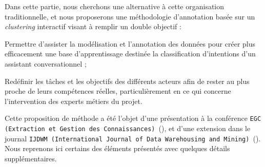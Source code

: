 	Dans cette partie, nous cherchons une alternative à cette organisation traditionnelle, et nous proposerons une méthodologie d'annotation basée sur un \textit{clustering} interactif visant à remplir un double objectif :
	\begin{leftBarImportantRed}
		\begin{todolist}
			\item Permettre d'assister la modélisation et l'annotation des données pour créer plus efficacement une base d'apprentissage destinée la classification d'intentions d'un assistant conversationnel ;
			\item Redéfinir les tâches et les objectifs des différents acteurs afin de rester au plus proche de leurs compétences réelles, particulièrement en ce qui concerne l'intervention des experts métiers du projet.
		\end{todolist}
	\end{leftBarImportantRed}
	
	\begin{leftBarInformation}
		Cette proposition de méthode a été l'objet d'une présentation à la conférence \texttt{EGC (Extraction et Gestion des Connaissances)}~(\cite{schild-etal:2021:conception-iterative-semisupervisee}), et d'une extension dans le journal \texttt{IJDWM (International Journal of Data Warehousing and Mining)}~(\cite{schild-etal:2022:iterative-semisupervised-design}).
		Nous reprenons ici certains des éléments présentés avec quelques détails supplémentaires.
	\end{leftBarInformation}

	\minitoc


	


	


	